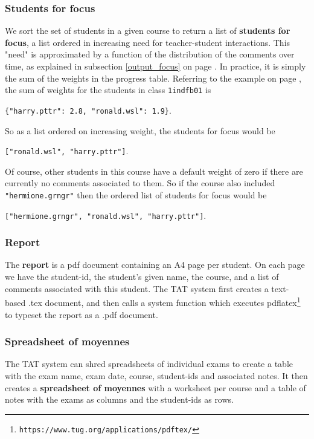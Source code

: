\documentclass[10pt]{article}
\begin{document}
\subsubsection{Students for focus}
We sort the set of students in a given course to return a list of \textbf{students for focus}, a list ordered in increasing need for teacher-student interactions. This "need" is approximated by a function of the distribution of the comments over time, as explained in subsection \ref{output_focus} on page \pageref{output_focus}. In practice, it is simply the sum of the weights in the progress table. Referring to the example on page \pageref{comments_table}, the sum of weights for the students in class \texttt{1indfb01} is
\begin{center}
\texttt{\{"harry.pttr": 2.8, "ronald.wsl": 1.9\}}.
\end{center}
So as a list ordered on increasing weight, the students for focus would be
\begin{center}
\texttt{["ronald.wsl", "harry.pttr"]}.
\end{center}
Of course, other students in this course have a default weight of zero if there are currently no comments associated to them. So if the course also included \texttt{"hermione.grngr"} then the ordered list of students for focus would be
\begin{center}
\texttt{["hermione.grngr", "ronald.wsl", "harry.pttr"]}.
\end{center}

\subsubsection{Report}
The \textbf{report} is a pdf document containing an A4 page per student. On each page we have the student-id, the student's given name, the course, and a list of comments associated with this student. The TAT system first creates a text-based .tex document, and then calls a system function which executes pdflatex\footnote{\texttt{https://www.tug.org/applications/pdftex/}} to typeset the report as a .pdf document.

\subsubsection{Spreadsheet of moyennes}
The TAT system can shred spreadsheets of individual exams to create a table with the exam name, exam date, course, student-ids and associated notes. It then creates a \textbf{spreadsheet of moyennes} with a worksheet per course and a table of notes with the exams as columns and the student-ids as rows.
\end{document}

